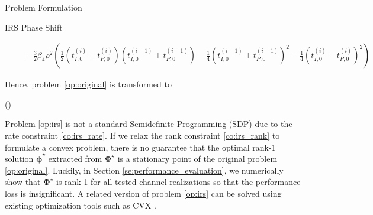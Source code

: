 \documentclass[journal]{IEEEtran}
\begin{document}
\begin{section}{Problem Formulation}
\begin{subsection}{IRS Phase Shift}
\begin{figure*}[b]
\begin{equation}
\begin{split}
						& \quad + \frac{3}{2}{\beta_4}{\rho^2} \left(\frac{1}{2}(t_{I,0}^{(i)} + t_{P,0}^{(i)})(t_{I,0}^{(i-1)} + t_{P,0}^{(i-1)}) - \frac{1}{4}(t_{I,0}^{(i-1)} + t_{P,0}^{(i-1)})^2 - \frac{1}{4}(t_{I,0}^{(i)} - t_{P,0}^{(i)})^2\right)
					\end{split}
				\end{equation}
			\end{figure*}
			Hence, problem \ref{op:original} is transformed to
			\begin{maxi!}
			{\boldsymbol{\Phi}}{(\boldsymbol{\Phi})}{\label{op:irs}}{\label{ob:irs}}
			\label{co:irs_rate}
			\label{co:irs_modulus}
		\end{maxi!}

			Problem \ref{op:irs} is not a standard Semidefinite Programming (SDP) due to the rate constraint \ref{co:irs_rate}. If we relax the rank constraint \ref{co:irs_rank} to formulate a convex problem, there is no guarantee that the optimal rank-1 solution $\bar{\boldsymbol{\phi}}^{\star}$ extracted from $\boldsymbol{\Phi}^{\star}$ is a stationary point of the original problem \ref{op:original}. Luckily, in Section \ref{se:performance_evaluation}, we numerically show that $\boldsymbol{\Phi}^{\star}$ is rank-1 for all tested channel realizations so that the performance loss is insignificant. A related version of problem \ref{op:irs} can be solved using existing optimization tools such as CVX \cite{Grant2013}.


\end{subsection}
\end{section}
\end{document}
